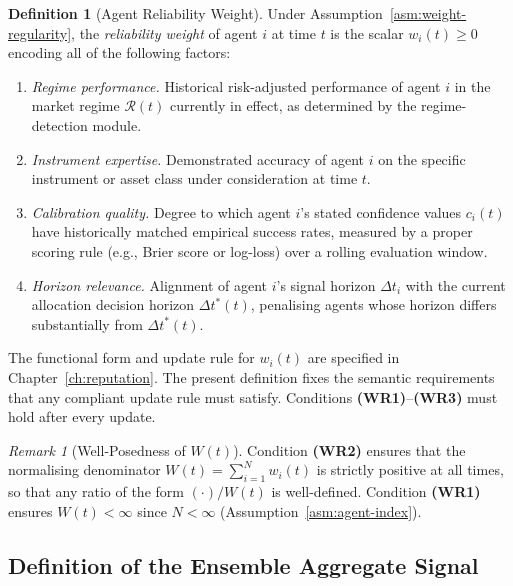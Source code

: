 \documentclass[12pt,openany]{book}
\numberwithin{equation}{chapter}
\theoremstyle{plain}
\theoremstyle{definition}
\newtheorem{definition}[theorem]{Definition}
\theoremstyle{remark}
\newtheorem{remark}[theorem]{Remark}
\numberwithin{equation}{chapter}
\theoremstyle{plain}
\begin{document}
\begin{definition}[Agent Reliability Weight]
\label{def:reliability-weight}
Under Assumption~\ref{asm:weight-regularity}, the
\emph{reliability weight} of agent $i$ at time $t$ is the scalar
$w_i(t) \geq 0$ encoding all of the following factors:
\begin{enumerate}
  \item \emph{Regime performance.}
        Historical risk-adjusted performance of agent $i$ in the
        market regime $\mathcal{R}(t)$ currently in effect, as
        determined by the regime-detection module.
  \item \emph{Instrument expertise.}
        Demonstrated accuracy of agent $i$ on the specific
        instrument or asset class under consideration at time $t$.
  \item \emph{Calibration quality.}
        Degree to which agent $i$'s stated confidence values
        $c_i(t)$ have historically matched empirical success rates,
        measured by a proper scoring rule (e.g., Brier score or
        log-loss) over a rolling evaluation window.
  \item \emph{Horizon relevance.}
        Alignment of agent $i$'s signal horizon $\Delta t_i$ with
        the current allocation decision horizon $\Delta t^{*}(t)$,
        penalising agents whose horizon differs substantially from
        $\Delta t^{*}(t)$.
\end{enumerate}
The functional form and update rule for $w_i(t)$ are specified in
Chapter~\ref{ch:reputation}.  The present definition fixes the
semantic requirements that any compliant update rule must satisfy.
Conditions \textbf{(WR1)}--\textbf{(WR3)} must hold after every
update.
\end{definition}

\begin{remark}[Well-Posedness of $W(t)$]
\label{rem:W-well-posed}
Condition \textbf{(WR2)} ensures that the normalising denominator
$W(t) = \sum_{i=1}^{N} w_i(t)$ is strictly positive at all times,
so that any ratio of the form $(\cdot)/W(t)$ is well-defined.
Condition \textbf{(WR1)} ensures $W(t) < \infty$ since $N < \infty$
(Assumption~\ref{asm:agent-index}).
\end{remark}

\subsection{Definition of the Ensemble Aggregate Signal}
\end{document}
